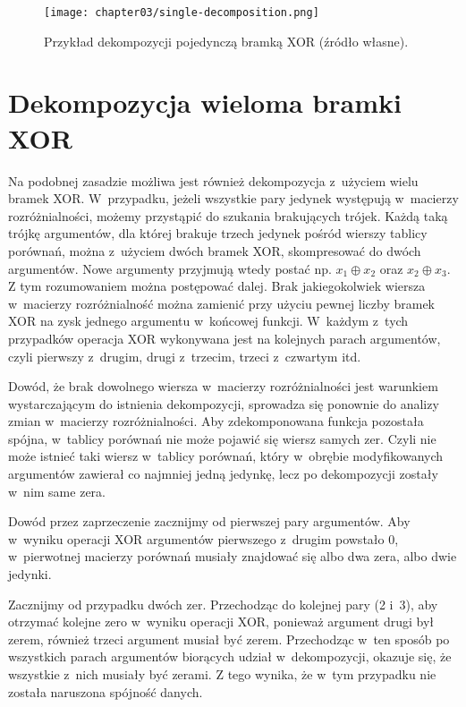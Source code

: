 \begin{figure}[H]
\centering
\texttt{[image: chapter03/single-decomposition.png]}
\caption{Przykład dekompozycji pojedynczą bramką XOR (źródło własne).}
\end{figure}

\section{Dekompozycja wieloma bramki XOR}

Na podobnej zasadzie możliwa jest również dekompozycja z~użyciem wielu bramek XOR.
W~przypadku,
jeżeli wszystkie pary jedynek występują w~macierzy rozróżnialności,
możemy przystąpić do szukania brakujących trójek.
Każdą taką trójkę argumentów,
dla której brakuje trzech jedynek pośród wierszy tablicy porównań,
można z~użyciem dwóch bramek XOR,
skompresować do dwóch argumentów.
Nowe argumenty przyjmują wtedy postać np. $x_1 \oplus x_2$ oraz $x_2 \oplus x_3$.
Z tym rozumowaniem można postępować dalej.
Brak jakiegokolwiek wiersza w~macierzy rozróżnialność można zamienić przy użyciu pewnej liczby bramek XOR na zysk jednego argumentu w~końcowej funkcji.
W~każdym z~tych przypadków operacja XOR wykonywana jest na kolejnych parach argumentów,
czyli pierwszy z~drugim,
drugi z~trzecim,
trzeci z~czwartym itd.

Dowód,
że brak dowolnego wiersza w~macierzy rozróżnialności jest warunkiem wystarczającym do istnienia dekompozycji,
sprowadza się ponownie do analizy zmian w~macierzy rozróżnialności.
Aby zdekomponowana funkcja pozostała spójna,
w~tablicy porównań nie może pojawić się wiersz samych zer.
Czyli nie może istnieć taki wiersz w~tablicy porównań,
który w~obrębie modyfikowanych argumentów zawierał co najmniej jedną jedynkę,
lecz po dekompozycji zostały w~nim same zera.

Dowód przez zaprzeczenie zacznijmy od pierwszej pary argumentów.
Aby w~wyniku operacji XOR argumentów pierwszego z~drugim powstało 0,
w~pierwotnej macierzy porównań musiały znajdować się albo dwa zera,
albo dwie jedynki.

Zacznijmy od przypadku dwóch zer.
Przechodząc do kolejnej pary (2 i~3),
aby otrzymać kolejne zero w~wyniku operacji XOR,
ponieważ argument drugi był zerem,
również trzeci argument musiał być zerem.
Przechodząc w~ten sposób po wszystkich parach argumentów biorących udział w~dekompozycji,
okazuje się,
że wszystkie z~nich musiały być zerami.
Z tego wynika,
że w~tym przypadku nie została naruszona spójność danych.

